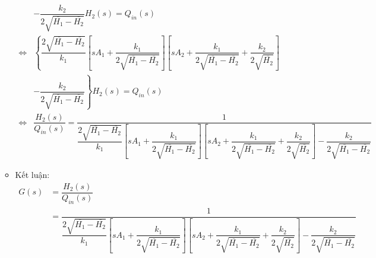 \begin{enumerate}[\it a.]
\begin{itemize}
\begin{align}
                            & - \dfrac{k_2}{2\sqrt{\overline{H_1} - \overline{H_2}}} H_2(s) = Q_{in}(s) \\
                            \Longleftrightarrow & \left\{{\dfrac{2\sqrt{\overline{H_1} - \overline{H_2}}}{k_1} \left[{s A_1 + \dfrac{k_1}{2\sqrt{\overline{H_1} - \overline{H_2}}}}\right] \left[{s A_2 + \dfrac{k_1}{2 \sqrt{\overline{H_1} - \overline{H_2}}} + \dfrac{k_2}{2 \sqrt{\overline{H_2}}}}\right]}\right. \nonumber \\
                            & \left.{- \dfrac{k_2}{2\sqrt{\overline{H_1} - \overline{H_2}}}}\right\} H_2(s) = Q_{in}(s) \\
                            \Longleftrightarrow & \dfrac{H_2(s)}{Q_{in}(s)} = \dfrac{1}{\dfrac{2\sqrt{\overline{H_1} - \overline{H_2}}}{k_1} \left[{s A_1 + \dfrac{k_1}{2\sqrt{\overline{H_1} - \overline{H_2}}}}\right] \left[{s A_2 + \dfrac{k_1}{2 \sqrt{\overline{H_1} - \overline{H_2}}} + \dfrac{k_2}{2 \sqrt{\overline{H_2}}}}\right] - \dfrac{k_2}{2\sqrt{\overline{H_1} - \overline{H_2}}}}
                        \end{align}

                    \item Kết luận:
                        \begin{align}
                            G(s) & = \dfrac{H_2(s)}{Q_{in}(s)} \nonumber\\
                            & = \dfrac{1}{\dfrac{2\sqrt{\overline{H_1} - \overline{H_2}}}{k_1} \left[{s A_1 + \dfrac{k_1}{2\sqrt{\overline{H_1} - \overline{H_2}}}}\right] \left[{s A_2 + \dfrac{k_1}{2 \sqrt{\overline{H_1} - \overline{H_2}}} + \dfrac{k_2}{2 \sqrt{\overline{H_2}}}}\right] - \dfrac{k_2}{2\sqrt{\overline{H_1} - \overline{H_2}}}}
                        \end{align}
                \end{itemize}
        \end{enumerate}
